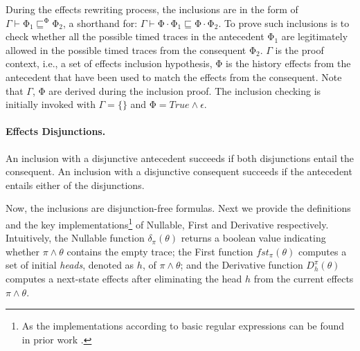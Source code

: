 \documentclass[acmsmall,10pt,review]{acmart}
\newcommand{\es}{\theta}
\newcommand{\effect}{{\ensuremath{\mathrm{\Phi}}}}
\newcommand{\code}[1]{{\tt{\ensuremath{\m{#1}}}}}
\newcommand{\CONTAIN}{\sqsubseteq}
\newcommand{\m}{\mathit}
\begin{document}
{During the effects rewriting process, the inclusions are in the form of \code{\Gamma \vdash  \effect_1 \CONTAIN^{\effect}  \effect_2 }, a shorthand for: \code{\Gamma \vdash  \effect \cdot \effect_1 \CONTAIN   \effect \cdot  \effect_2}. To prove such inclusions is to check whether all the possible timed traces in the antecedent \code{\effect_1} are legitimately allowed  in the possible timed traces from the consequent \code{\effect_2}.
\code{\Gamma} is the proof context, i.e., a set of effects inclusion hypothesis, \code{\effect} is the history effects from the antecedent that have been used to match the effects from the consequent.
Note that \code{\Gamma}, \code{\effect} are derived during the inclusion proof. 
The inclusion checking is initially invoked with \code{\Gamma{=}\{\}} and 
\code{\effect{=} True \wedge  \epsilon}. 







\paragraph{\textbf{Effects Disjunctions.}}
An inclusion with a disjunctive antecedent succeeds if both disjunctions entail the consequent.  An inclusion with a disjunctive consequent succeeds if the antecedent entails either of the disjunctions.  
{ 

}

\vspace{2mm}
Now, the inclusions are disjunction-free formulas. 
Next we provide the definitions and the key implementations\footnote{As 
the implementations according to basic regular expressions can be found 
in prior work \cite{DBLP:conf/fsttcs/KeilT14}. 
} of Nullable, First and Derivative respectively. Intuitively, 
the Nullable function \code{\delta_{{\pi}}(\es)} returns a boolean 
value indicating whether \code{{\pi} \wedge \es} contains the empty 
trace; the First function \code{fst_{{\pi}}( \es)} computes a set of 
 initial \emph{heads}, denoted as \code{h},  of \code{{\pi} \wedge \es}; and the Derivative 
function \code{D^{\pi}_{h}(\es)} computes a next-state 
effects after eliminating the head  \code{h} from the current 
effects \code{{\pi} \wedge \es}. 

%


}
\end{document}
